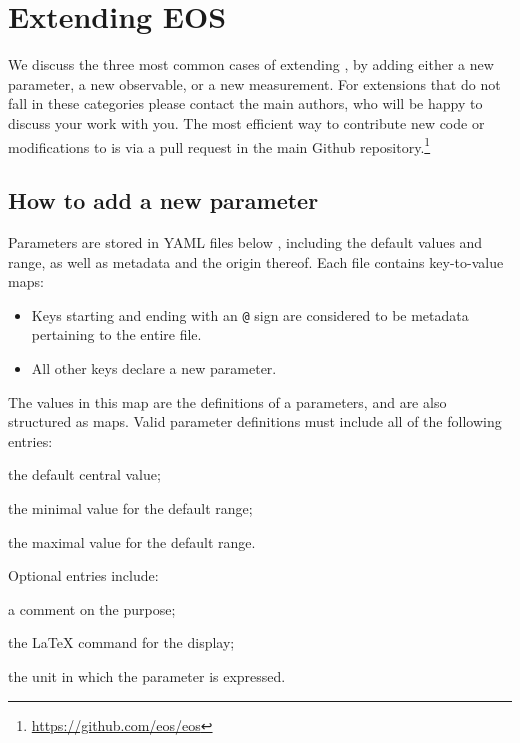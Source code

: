 \chapter{Extending EOS}
\label{ch:extending}

We discuss the three most common cases of extending \EOS, by adding either
a new parameter, a new observable, or a new measurement.
For extensions that do not fall in these categories please contact the main authors, who will be
happy to discuss your work with you. The most efficient way to contribute new code
or modifications to \EOS is via a pull request in the main Github repository.\footnote{
    \url{https://github.com/eos/eos}
}

\section{How to add a new parameter}
\label{sec:extending:parameter}

Parameters are stored in YAML files below , including the default values and range,
as well as metadata and the origin thereof. Each file contains key-to-value maps:
\begin{itemize}
    \item Keys starting and ending with an \texttt{@} sign are considered to be metadata pertaining
    to the entire file.

    \item All other keys declare a new parameter.
\end{itemize}
The values in this map are the definitions of a parameters, and are also structured as maps. Valid
parameter definitions must include all of the following entries:
\begin{description}[labelwidth=.15\textwidth]
    \item[central] the default central value;
    \item[min]     the minimal value for the default range;
    \item[max]     the maximal value for the default range.
\end{description}
Optional entries include:
\begin{description}[labelwidth=.15\textwidth]
    \item[comment] a comment on the purpose;
    \item[latex]   the LaTeX command for the display;
    \item[unit]    the unit in which the parameter is expressed.
\end{description}

